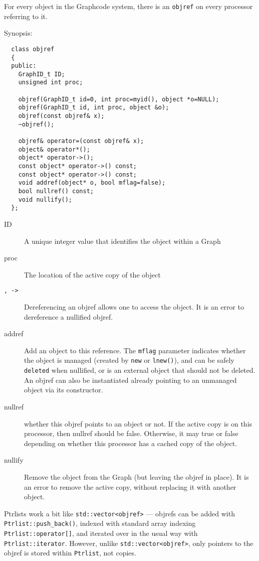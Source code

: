 \label{objref}

For every object in the Graphcode system, there is an \verb+objref+ on
every processor referring to it.

Synopsis:
\begin{verbatim}
  class objref
  {
  public:
    GraphID_t ID;
    unsigned int proc;

    objref(GraphID_t id=0, int proc=myid(), object *o=NULL);
    objref(GraphID_t id, int proc, object &o); 
    objref(const objref& x);
    ~objref();

    objref& operator=(const objref& x); 
    object& operator*();
    object* operator->();
    const object* operator->() const;
    const object* operator->() const;
    void addref(object* o, bool mflag=false); 
    bool nullref() const;
    void nullify();
  };
\end{verbatim}

\begin{description}
\item[ID] A unique integer value that identifies the object within a Graph
\item[proc] The location of the active copy of the object
\item[{\tt *, ->}] Dereferencing an objref allows one to access the
  object. It is an error to dereference a nullified objref.
\item[addref] Add an object to this reference. The \verb+mflag+
  parameter indicates whether the object is managed (created by \verb+new+ or
  \verb+lnew()+), and can be safely \verb+deleted+ when nullified, or
  is an external object that should not be deleted. An objref can also
  be instantiated already pointing to an unmanaged object via its constructor.
\item[nullref] whether this objref points to an object or not. If the
  active copy is on this processor, then nullref should be false.
  Otherwise, it may true or false depending on whether this processor
  has a cached copy of the object.
\item[nullify] Remove the object from the Graph (but leaving the
  objref in place). It is an error to remove the active copy, without
  replacing it with another object.
\end{description}


\label{Ptrlist}

Ptrlists work a bit like \verb+std::vector<objref>+ --- objrefs can be
added with \verb+Ptrlist::push_back()+, indexed with standard array
indexing \verb+Ptrlist::operator[]+, and iterated over in the usual
way with \verb+Ptrlist::iterator+. However, unlike
\verb+std::vector<objref>+, only pointers to the objref is stored
within \verb+Ptrlist+, not copies.

